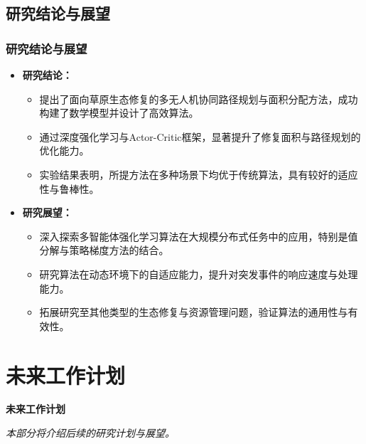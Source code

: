 \documentclass[11pt, aspectratio=169]{beamer}  %
\begin{document}
\subsection{研究结论与展望}
\begin{frame}
	\frametitle{研究结论与展望}
	\begin{itemize}
		\item \textbf{研究结论：}
		      \begin{itemize}
			      \item 提出了面向草原生态修复的多无人机协同路径规划与面积分配方法，成功构建了数学模型并设计了高效算法。
			      \item 通过深度强化学习与Actor-Critic框架，显著提升了修复面积与路径规划的优化能力。
			      \item 实验结果表明，所提方法在多种场景下均优于传统算法，具有较好的适应性与鲁棒性。
		      \end{itemize}
		\item \textbf{研究展望：}
		      \begin{itemize}
			      \item 深入探索多智能体强化学习算法在大规模分布式任务中的应用，特别是值分解与策略梯度方法的结合。
			      \item 研究算法在动态环境下的自适应能力，提升对突发事件的响应速度与处理能力。
			      \item 拓展研究至其他类型的生态修复与资源管理问题，验证算法的通用性与有效性。
		      \end{itemize}
	\end{itemize}
\end{frame}
\section{未来工作计划}
\begin{frame}
	\centering
	{\Huge \sffamily\bfseries\textcolor{njupt}{未来工作计划}}
	\par
	\vspace{0.5cm}
	{\large \itshape{本部分将介绍后续的研究计划与展望。}}
\end{frame}
\end{document}
